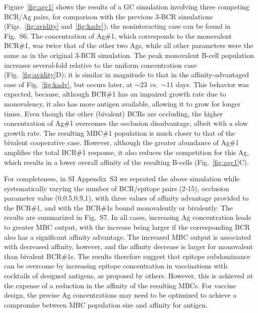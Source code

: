 \documentclass[utf8]{frontiersHLTH}%
\newcommand{\vo}[1]{#1} %
\def\vs {{\it vs.}}
\newcommand{\fig}[1]{Fig.~\ref{fig:#1}}
\newcommand{\figs}[2]{Figs.~\ref{fig:#1} and~\ref{fig:#2}}
\newcommand{\Fig}[1]{Figure~\ref{fig:#1}}
\newcommand{\SI}{SI Appendix}
\begin{document}
%
\Fig{agc1} shows the results of a GC simulation involving three
competing BCR/Ag pairs, for comparison with the previous 3-BCR simulations (\figs{avidity}{kadv});
the noninteracting case can be found in Fig.~S6.
The concentration of
Ag\#1, which corresponds to the monovalent BCR\#1, was twice that of
the other two Ags, while all other parameters were the same as in the
original 3-BCR simulation. The peak monovalent
B-cell population increases several-fold relative to the uniform concentration
case (\fig{avidity}D); it is similar in magnitude to that in the
affinity-advantaged case of \fig{kadv}, but occurs later, at $\sim$23 \vs~$\sim$11 days. This
behavior was expected, because, although BCR\#1 has an impaired
growth rate due to monovalency, it also has more antigen available, allowing it
to grow for longer times. Even though the other (bivalent) BCRs are
occluding, the higher concentration of Ag\#1 overcomes the occlusion disadvantage,
albeit with a slow growth rate. The resulting MBC\#1 population
is much closer to that of the bivalent cooperative case.
However, although the greater abundance of Ag\#1 amplifies the total BCR\#1
response, it also reduces the competition for this Ag, which results in
a lower overall affinity of the resulting B-cells (\fig{agc1}C).

For completeness, in \SI~S3 we repeated the above simulation while systematically varying the
number of BCR/epitope pairs \vo{(2-15)}, occlusion parameter value \vo{(0,0.5,0.9,1)}, with
three values of affinity advantage provided to the
BCR\#1, and with the BCR\#1s bound monovalently or bivalently. The results are summarized in Fig.~S7.
In all cases, increasing Ag concentration leads to
greater MBC output, with the increase being larger if the
corresponding BCR also has a significant affinity advantage.
The increased MBC output is associated with decreased affinity, however, and the affinity decrease
is larger for monovalent than bivalent
BCR\#1s. The results therefore suggest that
epitope subdominance can be overcome by increasing epitope concentration
in vaccinations with cocktails of designed antigens, as proposed by
others.\cite{kanekiyo19,cohen21,glanville20}  However, this is \vo{achieved} at the expense of a
reduction in the affinity of the resulting MBCs.
For vaccine design, the precise Ag concentrations may need to be 
optimized to achieve a compromise between MBC population
size and affinity for antigen.
\end{document}
